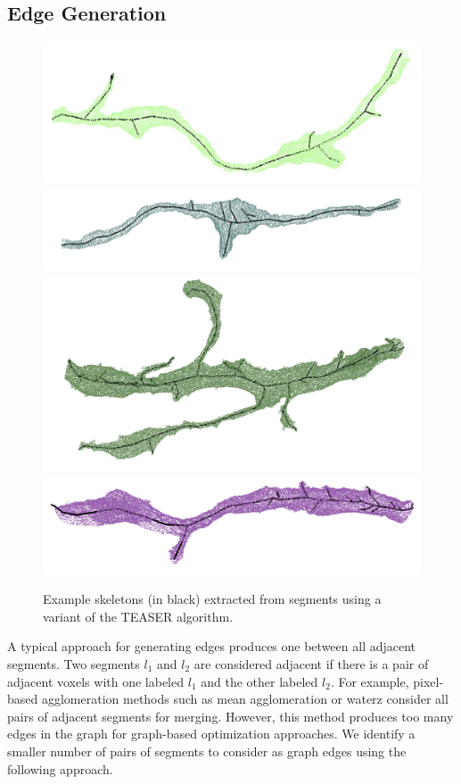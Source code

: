 \subsection{Edge Generation}

\begin{figure}[t]
	\centering
	\includegraphics[width=0.45\linewidth]{./figures/skeleton1.png}
	\includegraphics[width=0.45\linewidth]{./figures/skeleton2.png}
	\includegraphics[width=0.45\linewidth]{./figures/skeleton3.png}
	\includegraphics[width=0.45\linewidth]{./figures/skeleton4.png}
	\caption{Example skeletons (in black) extracted from segments using a variant of the TEASER algorithm.}
	\label{fig:skeletonization}
\end{figure}

A typical approach for generating edges produces one between all adjacent segments. Two segments $l_1$ and $l_2$ are considered adjacent if there is a pair of adjacent voxels with one labeled $l_1$ and the other labeled $l_2$.
For example, pixel-based agglomeration methods such as mean agglomeration  or waterz  consider all pairs of adjacent segments for merging.
However, this method produces too many edges in the graph for graph-based optimization approaches. 
We identify a smaller number of pairs of segments to consider as graph edges using the following approach.

